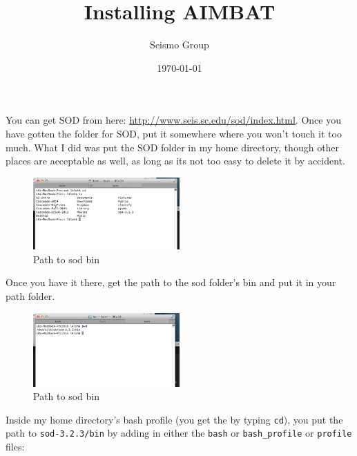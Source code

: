 \documentclass[letterpaper,10pt]{article}
\title{Installing AIMBAT}
\author{Seismo Group}
\date{\today}
\begin{document}
\maketitle



You can get SOD from here: \url{http://www.seis.sc.edu/sod/index.html}.
Once you have gotten the folder for SOD, put it somewhere where you won't touch it too much. What I did was put the SOD folder in my home directory, though other places are acceptable as well, as long as its not too easy to delete it by accident.

\begin{figure}[h!]
  \centering
  \includegraphics[width=0.5\textwidth]{images/sod_location}
  \caption{Path to sod bin}
  \label{fig:sod_location}
\end{figure}

Once you have it there, get the path to the sod folder's bin and put it in your path folder. 


\begin{figure}[h!]
  \centering
  \includegraphics[width=0.5\textwidth]{images/path_to_sod_bin}
  \caption{Path to sod bin}
  \label{fig:path_to_sod_bin}
\end{figure}

Inside my home directory's bash profile (you get the by typing \verb"cd"), you put the path to \verb"sod-3.2.3/bin" by adding in either the \verb"bash" or \verb"bash_profile" or \verb"profile" files: 
 
\end{document}
